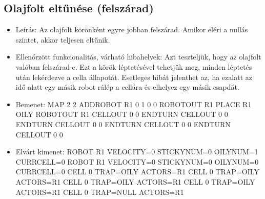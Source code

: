 \subsection{Olajfolt eltűnése (felszárad)}
\begin{itemize}
	\item Leírás: \newline
	Az olajfolt körönként egyre jobban felszárad. Amikor eléri a nullás szintet, akkor teljesen eltűnik. 
	\item Ellenőrzött funkcionalitás, várható hibahelyek: \newline 
	 Azt teszteljük, hogy az olajfolt valóban felszárad-e. Ezt a körök léptetésével tehetjük meg, minden léptetés után lekérdezve a cella állapotát.
	 Esetleges hibát jelenthet az, ha ezalatt az idő alatt egy másik robot rálép a cellára és elhelyez egy másik csapdát.
	\item Bemenet: \newline
	MAP 2 2 \newline
	ADDROBOT R1 0 1 0 0 \newline
	ROBOTOUT R1 \newline
	PLACE R1 OILY \newline
	ROBOTOUT R1 \newline
	CELLOUT 0 0 \newline
	ENDTURN \newline
	CELLOUT 0 0 \newline
	ENDTURN \newline
	CELLOUT 0 0 \newline
	ENDTURN \newline
	CELLOUT 0 0 \newline
	ENDTURN \newline
	CELLOUT 0 0 \newline
	\item Elvárt kimenet: \newline
	ROBOT R1 VELOCITY=0 STICKYNUM=0 OILYNUM=1 CURRCELL=0
	\newline
	ROBOT R1 VELOCITY=0 STICKYNUM=0 OILYNUM=0 
	CURRCELL=0
	\newline
	CELL 0 TRAP=OILY ACTORS=R1
	\newline
	CELL 0 TRAP=OILY ACTORS=R1
	\newline
	CELL 0 TRAP=OILY ACTORS=R1
	\newline
	CELL 0 TRAP=OILY ACTORS=R1
	\newline
	CELL 0 TRAP=NULL ACTORS=R1
\end{itemize}
